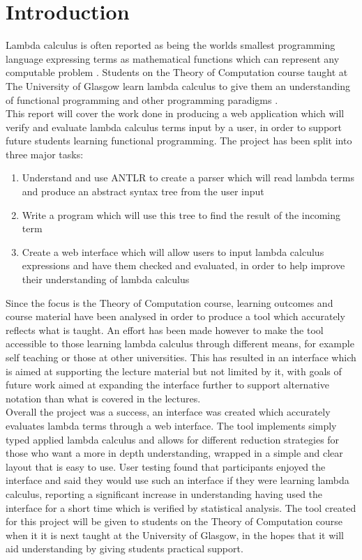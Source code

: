 \documentclass[a4paper,11pt]{report}
\begin{document}
\renewcommand{\cleardoublepage}{}
\renewcommand{\clearpage}{}
\setcounter{page}{1}
\chapter{Introduction}
Lambda calculus is often reported as being the worlds smallest programming language \cite{Michaelson2011} expressing terms as mathematical functions which can represent any computable problem \cite{Selinger2013}. Students on the Theory of Computation course taught at The University of Glasgow learn lambda calculus to give them an understanding of functional programming and other programming paradigms \cite{CourseSpecification}.\\

This report will cover the work done in producing a web application which will verify and evaluate lambda calculus terms input by a user, in order to support future students learning functional programming. The project has been split into three major tasks:

\begin{enumerate}
	\item Understand and use ANTLR to create a parser which will read lambda terms and produce an abstract syntax tree from the user input
	\item Write a program which will use this tree to find the result of the incoming term
	\item Create a web interface which will allow users to input lambda calculus expressions and have them checked and evaluated, in order to help improve their understanding of lambda calculus
\end{enumerate}

Since the focus is the Theory of Computation course, learning outcomes and course material have been analysed in order to produce a tool which accurately reflects what is taught. An effort has been made however to make the tool accessible to those learning lambda calculus through different means, for example self teaching or those at other universities. This has resulted in an interface which is aimed at supporting the lecture material but not limited by it, with goals of future work aimed at expanding the interface further to support alternative notation than what is covered in the lectures.\\

Overall the project was a success, an interface was created which accurately evaluates lambda terms through a web interface. The tool implements simply typed applied lambda calculus and allows for different reduction strategies for those who want a more in depth understanding, wrapped in a simple and clear layout that is easy to use. User testing found that participants enjoyed the interface and said they would use such an interface if they were learning lambda calculus, reporting a significant increase in understanding having used the interface for a short time which is verified by statistical analysis. The tool created for this project will be given to students on the Theory of Computation course when it it is next taught at the University of Glasgow, in the hopes that it will aid understanding by giving students practical support.\\
\end{document}
